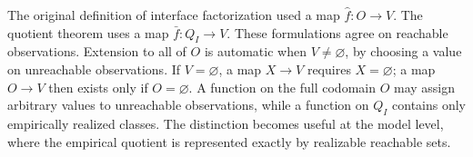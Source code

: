 The original definition of interface factorization used a map \(\hat f:O\to V\). The quotient theorem uses a map \(\bar f:Q_I\to V\). These formulations agree on reachable observations. Extension to all of \(O\) is automatic when \(V\neq\varnothing\), by choosing a value on unreachable observations. If \(V=\varnothing\), a map \(X\to V\) requires \(X=\varnothing\); a map \(O\to V\) then exists only if \(O=\varnothing\). A function on the full codomain \(O\) may assign arbitrary values to unreachable observations, while a function on \(Q_I\) contains only empirically realized classes. The distinction becomes useful at the model level, where the empirical quotient is represented exactly by realizable reachable sets.
